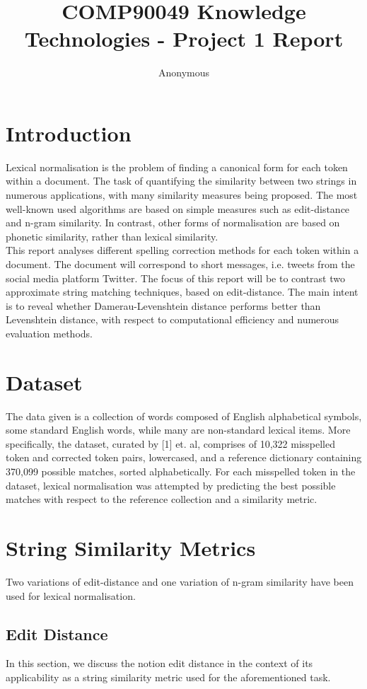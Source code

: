 \documentclass[11pt]{article}
\title{COMP90049 Knowledge Technologies - Project 1 Report}
\author
{Anonymous}
\begin{document}
\maketitle


\section{Introduction}
Lexical normalisation is the problem of finding a canonical form for each token within a document. The task of quantifying the similarity between two strings in numerous applications, with many similarity measures being proposed. The most well-known used algorithms are based on simple measures such as edit-distance and n-gram similarity. In contrast, other forms of normalisation are based on phonetic similarity, rather than lexical similarity.
\\

This report analyses different spelling correction methods for each token within a document. The document will correspond to short messages, i.e. tweets from the social media platform Twitter. The focus of this report will be to contrast two approximate string matching techniques, based on edit-distance. The main intent is to reveal whether Damerau-Levenshtein distance performs better than Levenshtein distance, with respect to computational efficiency and numerous evaluation methods.

\section{Dataset}
The data given is a collection of words composed of English alphabetical symbols, some standard English words, while many are non-standard lexical items.
More specifically, the dataset, curated by [1] et. al, comprises of 10,322 misspelled token and corrected token pairs, lowercased, and a reference dictionary containing 370,099 possible matches, sorted alphabetically. For each misspelled token in the dataset, lexical normalisation was attempted by predicting the best possible matches with respect to the reference collection and a similarity metric.

\section{String Similarity Metrics}
Two variations of edit-distance and one variation of n-gram similarity have been used for lexical normalisation.
\subsection{Edit Distance}
In this section, we discuss the notion edit distance in the context of its applicability as a string similarity metric used for the aforementioned task. 
\end{document}
